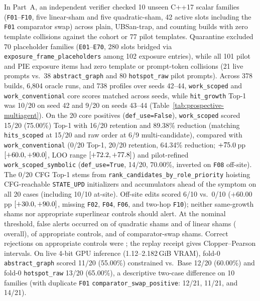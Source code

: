 In Part~A, an independent verifier checked 10 unseen C++17 scalar families (\texttt{F01}--\texttt{F10}, five linear-sham and five quadratic-sham, 42 active slots including the \texttt{F01} comparator swap) across plain, UBSan-trap, and counting builds with zero template collisions against the cohort or 77 pilot templates. Quarantine excluded 70 placeholder families (\texttt{E01}--\texttt{E70}, 280 slots bridged via \nolinkurl{exposure_frame_placeholders} among 102 exposure entries), while all 101 pilot and PIE exposure items had zero template or prompt-token collisions (21 live prompts vs.\ 38 \nolinkurl{abstract_graph} and 80 \nolinkurl{hotspot_raw} pilot prompts). Across 378 builds, 6,804 oracle runs, and 738 profiles over seeds 42--44, \texttt{work\_scoped} and \texttt{work\_conventional} core scores matched across seeds, while \texttt{hit\_growth} Top-1 was 10/20 on seed 42 and 9/20 on seeds 43--44 (Table~\ref{tab:prospective-multiagent}). On the 20 core positives (\nolinkurl{def_use=False}), \texttt{work\_scoped} scored 15/20 (75.00\%) Top-1 with 16/20 retention and 89.38\% reduction (matching \nolinkurl{hits_scoped} at 15/20 and raw order at 6/9 multi-candidate), compared with \texttt{work\_conventional} (0/20 Top-1, 20/20 retention, 64.34\% reduction; $+75.0$\,pp $[+60.0, +90.0]$, LOO range $[+72.2, +77.8]$) and pilot-refined \texttt{work\_scoped\_symbolic} (\nolinkurl{def_use=True}, 14/20, 70.00\%, inverted on \texttt{F08} off-site). The 0/20 CFG Top-1 stems from \nolinkurl{rank_candidates_by_role_priority} hoisting CFG-reachable \texttt{STATE\_UPD} initializers and accumulators ahead of the symptom on all 20 cases (including 10/10 at-site). Off-site edits scored 6/10 vs.\ 0/10 ($+60.00$\,pp $[+30.0, +90.0]$, missing \texttt{F02}, \texttt{F04}, \texttt{F06}, and two-hop \texttt{F10}); neither same-growth shams nor appropriate superlinear controls should alert. At the nominal threshold, false alerts occurred on \GroupedQuadraticFalse{} of quadratic shams and \GroupedLinearFalse{} of linear shams (\GroupedSameGrowthFalse{} overall), \GroupedAppropriateFalse{} of appropriate controls, and \GroupedSwapFalse{} of comparator-swap shams. Correct rejections on appropriate controls were \GroupedAppropriateCorrect{}; the replay receipt gives Clopper--Pearson intervals. On live 4-bit GPU inference (1.12--2.182\,GiB VRAM), fold-0 \nolinkurl{abstract_graph} scored 11/20 (55.00\%) constrained vs.\ Base 12/20 (60.00\%) and fold-0 \nolinkurl{hotspot_raw} 13/20 (65.00\%), a descriptive two-case difference on 10 families (with duplicate \texttt{F01} \nolinkurl{comparator_swap_positive}: 12/21, 11/21, and 14/21).

